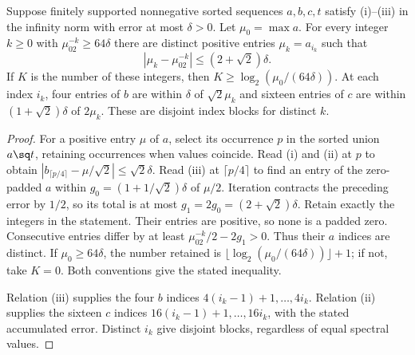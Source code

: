 \begin{lemma}\label{lem:descent}
Suppose finitely supported nonnegative sorted sequences $a,b,c,t$
satisfy (i)--(iii) in the infinity norm with error at most $\delta>0$.
Let $\mu_0=\max a$. For every integer $k\geq0$ with
$\mu_02^{-k}\geq64\delta$ there are distinct positive entries
$\mu_k=a_{i_k}$ such that
\begin{equation}\label{eq:descenterror}
|\mu_k-\mu_02^{-k}|\leq(2+\sqrt2)\delta.
\end{equation}
If $K$ is the number of these integers, then
$K\geq\log_2(\mu_0/(64\delta))$.
At each index $i_k$, four entries of $b$ are within $\delta$ of
$\sqrt2\mu_k$ and sixteen entries of $c$ are within
$(1+\sqrt2)\delta$ of $2\mu_k$. These are disjoint index blocks
for distinct $k$.
\end{lemma}
\begin{proof}
For a positive entry $\mu$ of $a$, select its occurrence $p$ in the
sorted union $a\sq t$, retaining occurrences when values coincide.
Read (i) and (ii) at $p$ to obtain
$|b_{\lceil p/4\rceil}-\mu/\sqrt2|\leq\sqrt2\delta$.
Read (iii) at $\lceil p/4\rceil$ to find an entry of the zero-padded
$a$ within
$g_0=(1+1/\sqrt2)\delta$ of $\mu/2$.
Iteration contracts the preceding error by $1/2$, so its total is at
most $g_1=2g_0=(2+\sqrt2)\delta$.
Retain exactly the integers in the statement. Their entries are
positive, so none is a padded zero. Consecutive entries differ by at
least $\mu_02^{-k}/2-2g_1>0$. Thus their $a$ indices are distinct.
If $\mu_0\geq64\delta$, the number retained is
$\lfloor\log_2(\mu_0/(64\delta))\rfloor+1$; if not, take $K=0$.
Both conventions give the stated inequality.

Relation (iii) supplies the four $b$ indices
$4(i_k-1)+1,\ldots,4i_k$. Relation (ii) supplies the sixteen $c$
indices $16(i_k-1)+1,\ldots,16i_k$, with the stated accumulated error.
Distinct $i_k$ give disjoint blocks, regardless of equal spectral values.
\end{proof}

